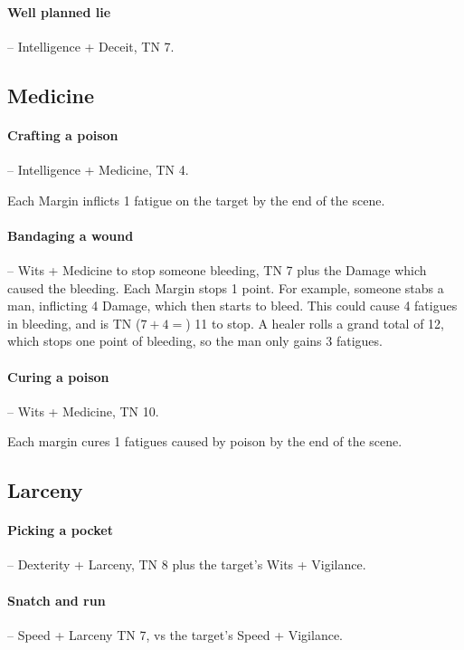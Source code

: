 \begin{multicols}{2}
\paragraph{Well planned lie} -- Intelligence + Deceit, TN 7.

\subsection{Medicine}

\paragraph{Crafting a poison} -- Intelligence + Medicine, TN 4.
\label{poison}

Each Margin inflicts 1 \gls{fatigue} on the target by the end of the scene.

\paragraph{Bandaging a wound} -- Wits + Medicine to stop someone bleeding, TN 7 plus the Damage which caused the bleeding.
Each Margin stops 1 point.
For example, someone stabs a man, inflicting 4 Damage, which then starts to bleed.
This could cause 4 \glspl{fatigue} in bleeding, and is TN ($7 + 4 = $) 11 to stop.
A healer rolls a grand total of 12, which stops one point of bleeding, so the man only gains 3 \glspl{fatigue}.

\paragraph{Curing a poison} -- Wits + Medicine, TN 10.

Each margin cures 1 \glspl{fatigue} caused by poison by the end of the scene.

\subsection{Larceny}

\paragraph{Picking a pocket} -- Dexterity + Larceny, TN 8 plus the target's Wits + Vigilance.

\paragraph{Snatch and run} -- Speed + Larceny TN 7, vs the target's Speed + Vigilance.


\end{multicols}
